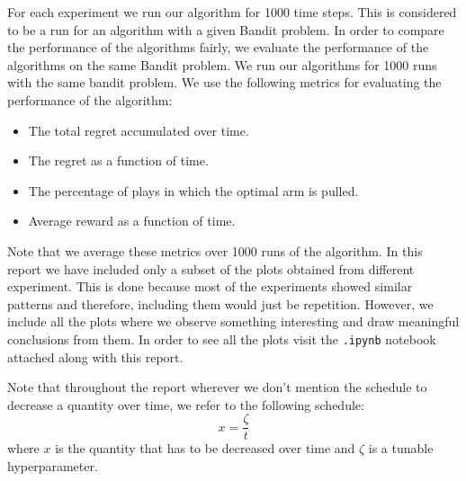 \documentclass{article}
\begin{document}
	\noindent %
	For each experiment we run our algorithm for 1000 time steps. This is considered to be a run for an algorithm with a given Bandit problem. In order to compare
	the performance of the algorithms fairly, we evaluate the performance of the algorithms on the same Bandit problem. We run our algorithms for 1000
	runs with the same bandit problem. We use the following metrics for evaluating the performance of the algorithm:
	
	\begin{itemize}
		\item The total regret accumulated over time.
		\item The regret as a function of time.
		\item The percentage of plays in which the optimal arm is pulled.
		\item Average reward as a function of time.
	\end{itemize}
	
	Note that we average these metrics over 1000 runs of the algorithm. In this report we have included only a subset of the plots obtained from different experiment.
	This is done because most of the experiments showed similar patterns and therefore, including them would just be repetition. However, we include all the plots
	where we observe something interesting and draw meaningful conclusions from them. In order to see all the plots visit the \verb|.ipynb| notebook attached along
	with this report. \par
	
	\noindent %
	Note that throughout the report wherever we don't mention the schedule to decrease a quantity over time, we refer to the following schedule:
	\begin{equation}
		x = \frac{\zeta}{t}
	\label{default_schedule}
	\end{equation}
	where $x$ is the quantity that has to be decreased over time and $\zeta$ is a tunable hyperparameter.
	
\end{document}
